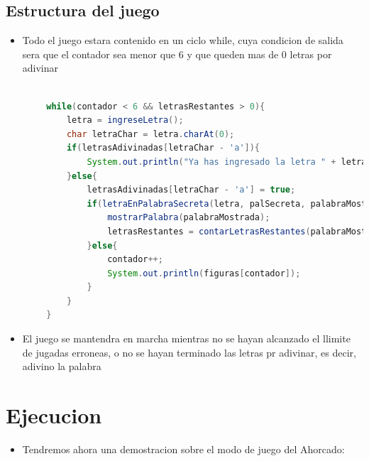 \documentclass{article}
\begin{document}
        \subsection{Estructura del juego}
        \begin{itemize}
            \item Todo el juego estara contenido en un ciclo while, cuya condicion de salida sera que el contador sea menor que 6 y que queden mas de 0 letras por adivinar
        \end{itemize}
        \begin{lstlisting}[language=java, caption={Metodo principal}]
        
        while(contador < 6 && letrasRestantes > 0){
            letra = ingreseLetra();
            char letraChar = letra.charAt(0);
            if(letrasAdivinadas[letraChar - 'a']){
                System.out.println("Ya has ingresado la letra " + letra);
            }else{
                letrasAdivinadas[letraChar - 'a'] = true;
                if(letraEnPalabraSecreta(letra, palSecreta, palabraMostrada)){
                    mostrarPalabra(palabraMostrada);
                    letrasRestantes = contarLetrasRestantes(palabraMostrada);
                }else{
                    contador++;
                    System.out.println(figuras[contador]);
                }
            }
        }
        \end{lstlisting}
        \begin{itemize}
            \item El juego se mantendra en marcha mientras no se hayan alcanzado el llimite de jugadas erroneas, o no se hayan terminado las letras pr adivinar, es decir, adivino la palabra
        \end{itemize}
    \section{Ejecucion}
    \begin{itemize}
        \item Tendremos ahora una demostracion sobre el modo de juego del Ahorcado:
    \end{itemize}
\end{document}
